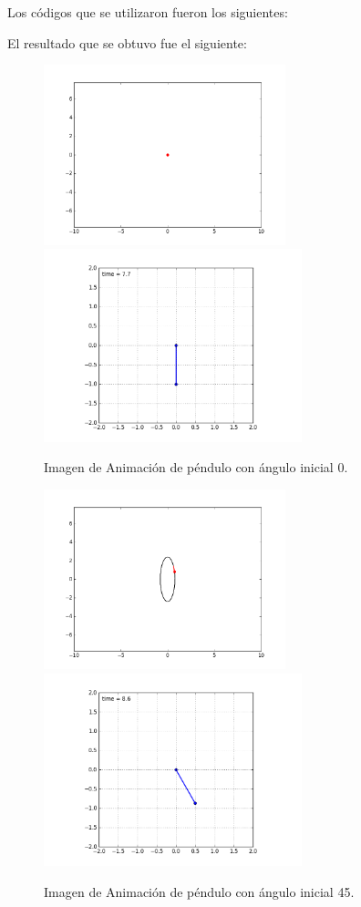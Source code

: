 \documentclass[12pt]{article}
\begin{document}
Los códigos que se utilizaron fueron los siguientes:


El resultado que se obtuvo fue el siguiente:

\begin{figure}[H]
\centering
\includegraphics[width=7cm]{Fase0.png}
\includegraphics[width=7.5cm]{Pendulo0.png}
\caption{Imagen de Animación de péndulo con ángulo inicial 0.}
\end{figure}

\begin{figure}[H]
\centering
\includegraphics[width=7cm]{Fase45.png}
\includegraphics[width=7.5cm]{Pendulo45.png}
\caption{Imagen de Animación de péndulo con ángulo inicial 45.}
\end{figure}
\end{document}
